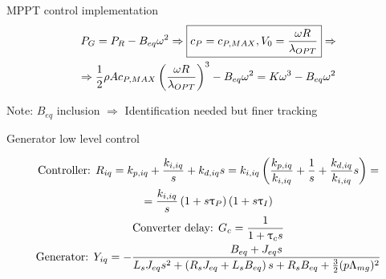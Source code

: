 \begin{frame}{MPPT control implementation}
  \begin{gather}
    P_G = P_R - B_{eq} \omega^2 \Rightarrow \boxed{c_P = c_{P,MAX}, V_0=\frac{\omega R}{\lambda_{OPT}}} \Rightarrow \notag\\
    \Rightarrow \frac{1}{2}\rho A c_{P,MAX} \left(\frac{\omega R}{\lambda_{OPT}}\right)^3 - B_{eq} \omega^2=K\omega^3 - B_{eq} \omega^2
    \notag
  \end{gather}

  \begin{figure}
      \centering
      \begingroup
        
      \endgroup
  \end{figure}
  Note: $B_{eq}$ inclusion $\Rightarrow$ Identification needed but finer tracking
\end{frame}

\begin{frame}{Generator low level control}
  \begin{figure}[H]
    \centering
    \begingroup
      
    \endgroup
  \end{figure}

  \begin{gather}
    \text{Controller: } R_{iq}=k_{p,iq} + \frac{k_{i,iq}}{s}+k_{d,iq}s=k_{i,iq}\left( \frac{k_{p,iq}}{k_{i,iq}} + \frac{1}{s} + \frac{k_{d,iq}}{k_{i,iq}}s \right) = \notag\\
    =\frac{k_{i,iq}}{s}\left(1+s\uptau_P\right)\left(1+s\uptau_I\right) \notag\\
    \text{Converter delay: } G_c = \frac{1}{1+\uptau_cs} \notag\\
    \text{Generator: } Y_{iq} = -\frac{B_{eq} + J_{eq}s}{L_sJ_{eq}s^2+\left(R_sJ_{eq} + L_s B_{eq}\right)s + R_sB_{eq} + \frac{3}{2}(p\Lambda_{mg})^2} \notag        
  \end{gather}
\end{frame}